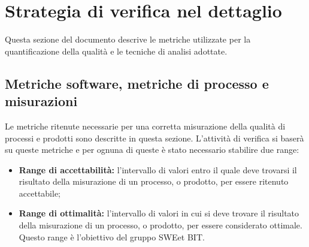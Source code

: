 \section{Strategia di verifica nel dettaglio}
  Questa sezione del documento descrive le metriche utilizzate per la quantificazione della qualità e le tecniche di analisi adottate.

  \subsection{Metriche software, metriche di processo e misurazioni}
  Le metriche ritenute necessarie per una corretta misurazione della qualità di processi e prodotti sono descritte in questa sezione.
  L'attività di verifica si baserà su queste metriche e per ognuna di queste è stato necessario stabilire due range:
  \begin{itemize}
    \item \textbf{Range di accettabilità:} l'intervallo di valori entro il quale deve trovarsi il risultato della misurazione di un processo, o prodotto, per essere ritenuto accettabile;
    \item \textbf{Range di ottimalità:} l'intervallo di valori in cui si deve trovare il risultato della misurazione di un processo, o prodotto, per essere considerato ottimale.
    Questo range è l'obiettivo del gruppo SWEet BIT.
  \end{itemize}

